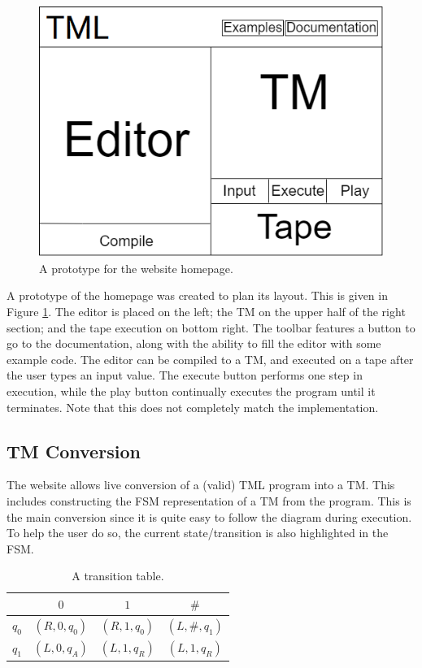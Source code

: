 \begin{figure}[htb]
    \centering
    \includegraphics{images/Index webpage prototype.png}
    \caption{A prototype for the website homepage.}
    \label{fig:homepage_prototype}
\end{figure}

A prototype of the homepage was created to plan its layout. This is given in Figure \ref{fig:homepage_prototype}. The editor is placed on the left; the TM on the upper half of the right section; and the tape execution on bottom right. The toolbar features a button to go to the documentation, along with the ability to fill the editor with some example code. The editor can be compiled to a TM, and executed on a tape after the user types an input value. The execute button performs one step in execution, while the play button continually executes the program until it terminates. Note that this does not completely match the implementation.

\subsection{TM Conversion}
The website allows live conversion of a (valid) TML program into a TM. This includes constructing the FSM representation of a TM from the program. This is the main conversion since it is quite easy to follow the diagram during execution. To help the user do so, the current state/transition is also highlighted in the FSM.

\begin{table}[htb]
    \centering
    \begin{tabular}{c|ccc}
        & $0$ & $1$ & $\#$ \\
        \hline
        $q_0$ & $(R, 0, q_0)$ & $(R, 1, q_0)$ & $(L, \#, q_1)$ \\
        $q_1$ & $(L, 0, q_A)$ & $(L, 1, q_R)$ & $(L, 1, q_R)$ 
    \end{tabular}
    \caption{A transition table.}
    \label{tbl:table_isDiv2}
\end{table}

